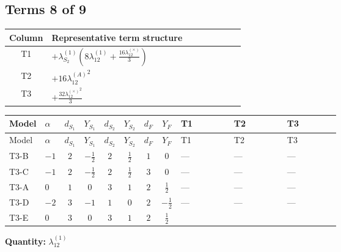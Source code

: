 \documentclass[8pt]{article}
\begin{document}
\begin{landscape}
\subsection*{Terms 8 of 9}
\begin{center}
\begin{tabular}{@{}c >{\raggedright\arraybackslash}p{0.82\linewidth}@{}}
\toprule
Column & Representative term structure \\
\midrule
T1 & \(\displaystyle +{\lambda_{S_2}^{(1)}} \left(8 {\lambda_{12}^{(1)}}+\frac{16 {\lambda_{12}^{(\times)}}}{3}\right)\) \\
\midrule
T2 & \(\displaystyle +16 {\lambda_{12}^{(A)}}^2\) \\
\midrule
T3 & \(\displaystyle +\frac{32 {\lambda_{12}^{(\times)}}^2}{3}\) \\
\midrule
\bottomrule
\end{tabular}
\end{center}
\smallskip
\tiny
\begin{longtable}{@{}llcccccc >{\raggedright\arraybackslash}p{0.21\linewidth} >{\raggedright\arraybackslash}p{0.21\linewidth} >{\raggedright\arraybackslash}p{0.21\linewidth}@{}}
\toprule
Model & $\alpha$ & $d_{S_1}$ & $Y_{S_1}$ & $d_{S_2}$ & $Y_{S_2}$ & $d_F$ & $Y_F$ & T1 & T2 & T3 \\
\midrule
\endfirsthead
\toprule
Model & $\alpha$ & $d_{S_1}$ & $Y_{S_1}$ & $d_{S_2}$ & $Y_{S_2}$ & $d_F$ & $Y_F$ & T1 & T2 & T3 \\
\midrule
\endhead
T3-B & $-1$ & $2$ & $-\frac{1}{2}$ & $2$ & $\frac{1}{2}$ & $1$ & $0$ & --- & --- & --- \\
\midrule
T3-C & $-1$ & $2$ & $-\frac{1}{2}$ & $2$ & $\frac{1}{2}$ & $3$ & $0$ & --- & --- & --- \\
\midrule
T3-A & $0$ & $1$ & $0$ & $3$ & $1$ & $2$ & $\frac{1}{2}$ & --- & --- & --- \\
\midrule
T3-D & $-2$ & $3$ & $-1$ & $1$ & $0$ & $2$ & $-\frac{1}{2}$ & --- & --- & --- \\
\midrule
T3-E & $0$ & $3$ & $0$ & $3$ & $1$ & $2$ & $\frac{1}{2}$ & \scriptsize\adjustbox{max width=\linewidth}{$\begin{gathered} +{\lambda_{S_2}^{(1)}} \left(8 {\lambda_{12}^{(1)}}+\frac{16 {\lambda_{12}^{(\times)}}}{3}\right)\end{gathered}$} & \scriptsize\adjustbox{max width=\linewidth}{$\begin{gathered} +16 {\lambda_{12}^{(A)}}^2\end{gathered}$} & \scriptsize\adjustbox{max width=\linewidth}{$\begin{gathered} +\frac{32 {\lambda_{12}^{(\times)}}^2}{3}\end{gathered}$} \\
\midrule
\bottomrule
\end{longtable}
\clearpage
\noindent\textbf{Quantity: }$\lambda_{12}^{(1)}$\par\smallskip

\end{landscape}
\end{document}
